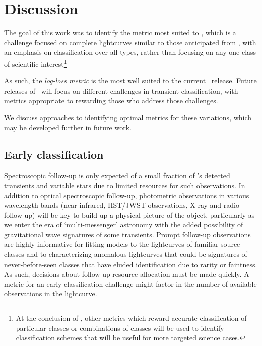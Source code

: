\section{Discussion}
\label{sec:discussion}
The goal of this work was to identify the metric most suited to \plasticc, which is a challenge focused on complete lightcurves similar to those anticipated from \lsst, with an emphasis on classification over all types, rather than focusing on any one class of scientific interest\footnote{At the conclusion of \plasticc, other metrics which reward accurate classification of particular classes or combinations of classes will be used to identify classification schemes that will be useful for more targeted science cases.}

As such, the \textit{log-loss metric} is the most well suited to the current \plasticc\ release. Future releases of \plasticc\ will focus on different challenges in transient classification, with metrics appropriate to rewarding those who address those challenges.


We discuss approaches to identifying optimal metrics for these variations, which may be developed further in future work.

\subsection{Early classification}
\label{sec:early}

Spectroscopic follow-up is only expected of a small fraction of \lsst's detected transients and variable stars due to limited resources for such observations. In addition to optical spectroscopic follow-up, photometric observations in various wavelength bands (near infrared, HST/JWST observations, X-ray and radio follow-up) will be key to build up a physical picture of the object, particularly as we enter the era of `multi-messenger' astronomy with the added possibility of gravitational wave signatures of some transients.
Prompt follow-up observations are highly informative for fitting models to the lightcurves of familiar source classes and to characterizing anomalous lightcurves that could be signatures of never-before-seen classes that have eluded identification due to rarity or faintness. As such, decisions about follow-up resource allocation must be made quickly. A metric for an early classification challenge might factor in the number of available observations in the lightcurve.

